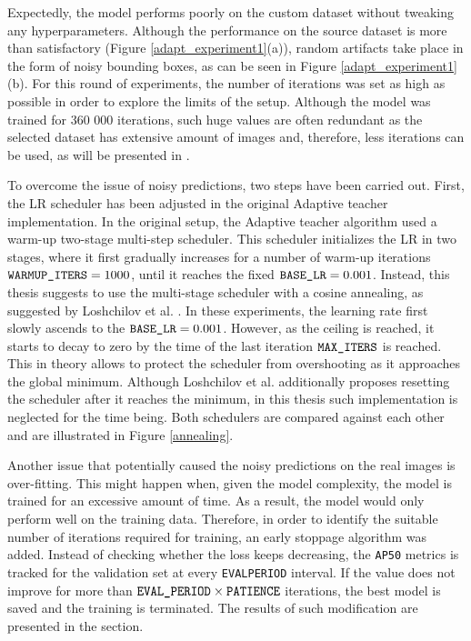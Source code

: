 \documentclass[english, 12pt, a4paper, elec, utf8, a-1b, online]{aaltothesis}
\begin{document}
Expectedly, the model performs poorly on the custom dataset without tweaking any hyperparameters. Although the performance on the source dataset is more than satisfactory (Figure \ref{adapt_experiment1}(a)), random artifacts take place in the form of noisy bounding boxes, as can be seen in Figure \ref{adapt_experiment1}(b). For this round of experiments, the number of iterations was set as high as possible in order to explore the limits of the setup. Although the model was trained for 360 000 iterations, such huge values are often redundant as the selected dataset has extensive amount of images and, therefore, less iterations can be used, as will be presented in . 

To overcome the issue of noisy predictions, two steps have been carried out. First, the LR scheduler has been adjusted in the original Adaptive teacher \cite{Li2021} implementation. In the original setup, the Adaptive teacher algorithm used a warm-up two-stage multi-step scheduler. This scheduler initializes the LR in two stages, where it first gradually increases for a number of warm-up iterations $\texttt{WARMUP\textunderscore ITERS} = 1000$, until it reaches the fixed $\texttt{BASE\textunderscore LR} = 0.001$.  Instead, this thesis suggests to use the multi-stage scheduler with a cosine annealing, as suggested by Loshchilov et al. \cite{Loshchilov2016}. In these experiments, the learning rate first slowly ascends to the $\texttt{BASE\textunderscore LR} = 0.001$. However, as the ceiling is reached, it starts to decay to zero by the time of the last iteration $\texttt{MAX\textunderscore ITERS}$ is reached. This in theory allows to protect the scheduler from overshooting as it approaches the global minimum. Although Loshchilov et al. additionally proposes resetting the scheduler after it reaches the minimum, in this thesis such implementation is neglected for the time being. Both schedulers are compared against each other and are illustrated in Figure \ref{annealing}.

Another issue that potentially caused the noisy predictions on the real images is over-fitting. This might happen when, given the model complexity, the model is trained for an excessive amount of time. As a result, the model would only perform well on the training data. 
Therefore, in order to identify the suitable number of iterations required for training, an early stoppage algorithm was added. Instead of checking whether the loss keeps decreasing, the \texttt{AP50} metrics is tracked for the validation set at every \texttt{EVAL\textunderscore PERIOD} interval. If the value does not improve for more than $\texttt{EVAL\textunderscore PERIOD} \times \texttt{PATIENCE}$ iterations, the best model is saved and the training is terminated. The results of such modification are presented in the  section.  
\end{document}
